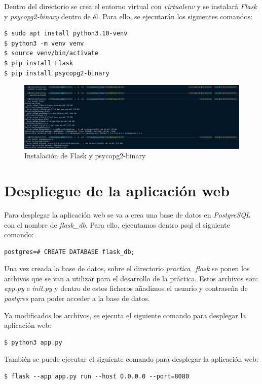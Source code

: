 \documentclass[11pt]{report}
\begin{document}
Dentro del directorio se crea el entorno virtual con \emph{virtualenv} y se instalará \emph{Flask} y
\emph{psycopg2-binary} dentro de él. Para ello, se ejecutarán los siguientes comandos:
\begin{verbatim}
$ sudo apt install python3.10-venv
$ python3 -m venv venv
$ source venv/bin/activate
$ pip install Flask
$ pip install psycopg2-binary
\end{verbatim}
\begin{figure}[H]
  \centering
  \includegraphics[scale=0.27]{img/instalation.png}
  \caption{Instalación de Flask y psycopg2-binary}
  \label{fig:instalacion_flask}
\end{figure}

\cleardoublepage
\section{Despliegue de la aplicación web}
Para desplegar la aplicación web se va a crea una base de datos en \emph{PostgreSQL} con el nombre
de \emph{flask\_db}. Para ello, ejecutamos dentro psql el siguiente comando:
\begin{verbatim}
postgres=# CREATE DATABASE flask_db;
\end{verbatim}

Una vez creada la base de datos, sobre el directorio \emph{practica\_flask} se ponen los archivos que se van
a utilizar para el desarrollo de la práctica. Estos archivos son: \emph{app.py} e \emph{init.py} y dentro de
estos ficheros añadimos el usuario y contraseña de \emph{postgres} para poder acceder a la base de datos.

Ya modificados los archivos, se ejecuta el siguiente comando para desplegar la aplicación web:
\begin{verbatim}
$ python3 app.py
\end{verbatim}

Tambi\'en se puede ejecutar el siguiente comando para desplegar la aplicación web:
\begin{verbatim}
$ flask --app app.py run --host 0.0.0.0 --port=8080
\end{verbatim}
\end{document}
